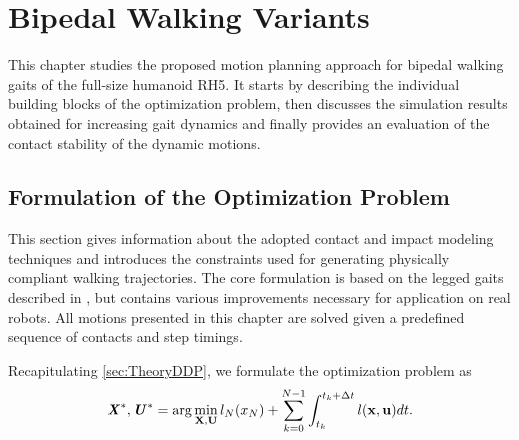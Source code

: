 
\chapter{Bipedal Walking Variants}\label{c4}
This chapter studies the proposed motion planning approach for bipedal walking gaits of the full-size humanoid RH5. It starts by describing the individual building blocks of the optimization problem, then discusses the simulation results obtained for increasing gait dynamics and finally provides an evaluation of the contact stability of the dynamic motions.

\section{Formulation of the Optimization Problem}
This section gives information about the adopted contact and impact modeling techniques and introduces the constraints used for generating physically compliant walking trajectories. The core formulation is based on the legged gaits described in \cite{mastalli20crocoddyl}, but contains various improvements necessary for application on real robots. All motions presented in this chapter are solved given a predefined sequence of contacts and step timings. 

Recapitulating \cref{sec:TheoryDDP}, we formulate the optimization problem as
\begin{equation}\label{eqn:optimizationProblem}
\bm{\mathit{X}}^*,\bm{\mathit{U}}^*= 
\arg\min_{\mathbf{X},\mathbf{U}} l_N(x_N)+\sum_{k=0}^{N-1} \int_{t_k}^{t_k+\Delta t} l(\mathbf{x},\mathbf{u})dt. 
\end{equation}

